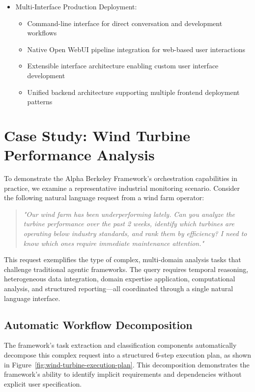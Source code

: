 \begin{itemize}
    \item Multi-Interface Production Deployment:
    \begin{itemize}
        \item Command-line interface for direct conversation and development workflows
        \item Native Open WebUI pipeline integration for web-based user interactions
        \item Extensible interface architecture enabling custom user interface development
        \item Unified backend architecture supporting multiple frontend deployment patterns
    \end{itemize}
\end{itemize}



\section{Case Study: Wind Turbine Performance Analysis}
\label{sec:windturbine}

To demonstrate the Alpha Berkeley Framework's orchestration capabilities in practice, we examine a representative industrial monitoring scenario. Consider the following natural language request from a wind farm operator:

\begin{quote}
\textit{"Our wind farm has been underperforming lately. Can you analyze the turbine performance over the past 2 weeks, identify which turbines are operating below industry standards, and rank them by efficiency? I need to know which ones require immediate maintenance attention."}
\end{quote}

This request exemplifies the type of complex, multi-domain analysis tasks that challenge traditional agentic frameworks. The query requires temporal reasoning, heterogeneous data integration, domain expertise application, computational analysis, and structured reporting—all coordinated through a single natural language interface.

\subsection{Automatic Workflow Decomposition}

The framework's task extraction and classification components automatically decompose this complex request into a structured 6-step execution plan, as shown in Figure~\ref{fig:wind-turbine-execution-plan}. This decomposition demonstrates the framework's ability to identify implicit requirements and dependencies without explicit user specification.

